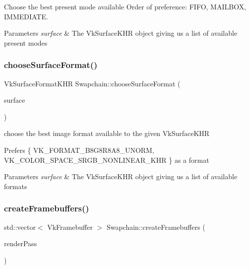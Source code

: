Choose the best present mode available Order of preference\+: F\+I\+FO, M\+A\+I\+L\+B\+OX, I\+M\+M\+E\+D\+I\+A\+TE. 


\begin{DoxyParams}{Parameters}
{\em surface} & The Vk\+Surface\+K\+HR object giving us a list of available present modes \\
\hline
\end{DoxyParams}
\mbox{\label{class_swapchain_adf8974fc6cde1ce9b5359b9ea1443018}} 
\subsubsection{\texorpdfstring{chooseSurfaceFormat()}{chooseSurfaceFormat()}}
{\footnotesize\ttfamily Vk\+Surface\+Format\+K\+HR Swapchain\+::choose\+Surface\+Format (\begin{DoxyParamCaption}\item[{Vk\+Surface\+K\+HR}]{surface }\end{DoxyParamCaption})\hspace{0.3cm}{\ttfamily [private]}}



choose the best image format available to the given Vk\+Surface\+K\+HR 

Prefers \{ V\+K\+\_\+\+F\+O\+R\+M\+A\+T\+\_\+\+B8\+G8\+R8\+A8\+\_\+\+U\+N\+O\+RM, V\+K\+\_\+\+C\+O\+L\+O\+R\+\_\+\+S\+P\+A\+C\+E\+\_\+\+S\+R\+G\+B\+\_\+\+N\+O\+N\+L\+I\+N\+E\+A\+R\+\_\+\+K\+HR \} as a format


\begin{DoxyParams}{Parameters}
{\em surface} & The Vk\+Surface\+K\+HR object giving us a list of available formats \\
\hline
\end{DoxyParams}
\mbox{\label{class_swapchain_ade933007b10309e978180d91fdfc129b}} 
\subsubsection{\texorpdfstring{createFramebuffers()}{createFramebuffers()}}
{\footnotesize\ttfamily std\+::vector$<$ Vk\+Framebuffer $>$ Swapchain\+::create\+Framebuffers (\begin{DoxyParamCaption}\item[{Vk\+Render\+Pass}]{render\+Pass }\end{DoxyParamCaption})}



